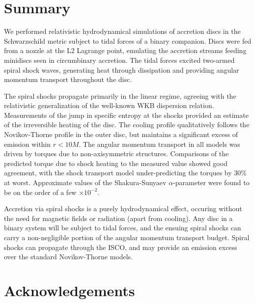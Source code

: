 \documentclass{emulateapj}
\newcommand{\al}{\alpha}
\begin{document}

\section{Summary}
\label{sec:summary}

We performed relativistic hydrodynamical simulations of accretion discs in the Schwarzschild metric subject to tidal forces of a binary companion.  Discs were fed from a nozzle at the L2 Lagrange point, emulating the accretion streams feeding minidiscs seen in circumbinary accretion.  The tidal forces excited two-armed spiral shock waves,  generating heat through dissipation and providing angular momentum transport throughout the disc.

The spiral shocks propagate primarily in the linear regime, agreeing with the relativistic generalization of the well-known WKB dispersion relation.  Measurements of the jump in specific entropy at the shocks provided an estimate of the irreversible heating of the disc.  The cooling profile qualitatively follows the Novikov-Thorne profile in the outer disc, but maintains a significant excess of emission within $r < 10 M$.  The angular momentum transport in all models was driven by torques due to non-axisymmetric structures.  Comparisons of the predicted torque due to shock heating to the measured value showed good agreement, with the shock transport model under-predicting the torques by $30\%$ at worst.  Approximate values of the Shakura-Sunyaev $\al$-parameter were found to be on the order of a few $\times 10^{-2}$.

Accretion via spiral shocks is a purely hydrodynamical effect, occuring without the need for magnetic fields or radiation (apart from cooling).  Any disc in a binary system will be subject to tidal forces, and the ensuing spiral shocks can carry a non-negligible portion of the angular momentum transport budget.  Spiral shocks can propagate through the ISCO, and may provide an emission excess over the standard Novikov-Thorne models.


\section{Acknowledgements}


\newpage





%
\end{document}
